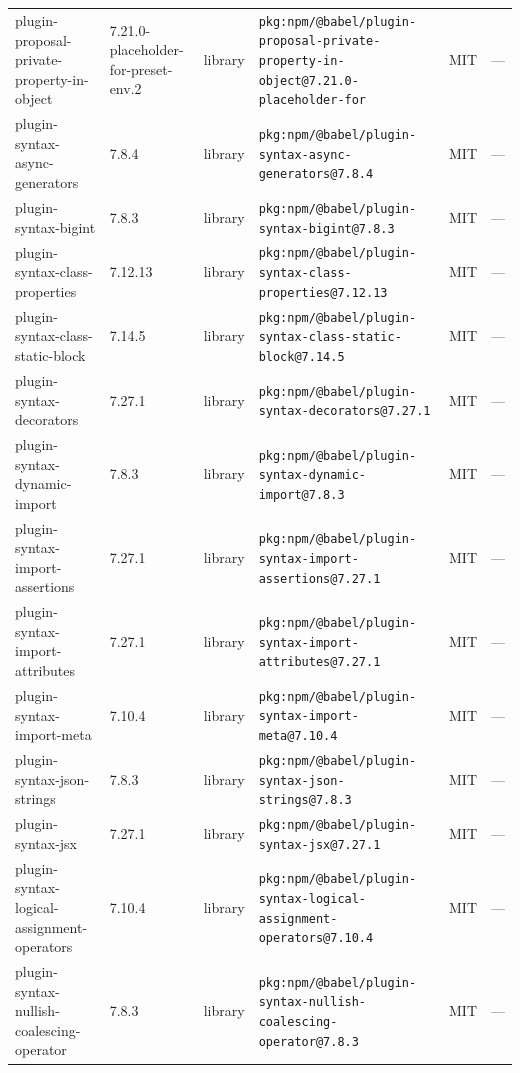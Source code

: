 \documentclass[11pt,a4paper]{article}
\begin{document}
\begin{longtable}{|p{4cm}|p{2cm}|p{1.6cm}|p{5cm}|p{1.5cm}|p{3.5cm}|}
\raggedright plugin-proposal-private-property-in-object & 7.21.0-placeholder-for-preset-env.2 & library & \small\texttt{pkg:npm/@babel/plugin-proposal-private-property-in-object@7.21.0-placeholder-for} & MIT & \small — \\
\raggedright plugin-syntax-async-generators & 7.8.4 & library & \small\texttt{pkg:npm/@babel/plugin-syntax-async-generators@7.8.4} & MIT & \small — \\
\raggedright plugin-syntax-bigint & 7.8.3 & library & \small\texttt{pkg:npm/@babel/plugin-syntax-bigint@7.8.3} & MIT & \small — \\
\raggedright plugin-syntax-class-properties & 7.12.13 & library & \small\texttt{pkg:npm/@babel/plugin-syntax-class-properties@7.12.13} & MIT & \small — \\
\raggedright plugin-syntax-class-static-block & 7.14.5 & library & \small\texttt{pkg:npm/@babel/plugin-syntax-class-static-block@7.14.5} & MIT & \small — \\
\raggedright plugin-syntax-decorators & 7.27.1 & library & \small\texttt{pkg:npm/@babel/plugin-syntax-decorators@7.27.1} & MIT & \small — \\
\raggedright plugin-syntax-dynamic-import & 7.8.3 & library & \small\texttt{pkg:npm/@babel/plugin-syntax-dynamic-import@7.8.3} & MIT & \small — \\
\raggedright plugin-syntax-import-assertions & 7.27.1 & library & \small\texttt{pkg:npm/@babel/plugin-syntax-import-assertions@7.27.1} & MIT & \small — \\
\raggedright plugin-syntax-import-attributes & 7.27.1 & library & \small\texttt{pkg:npm/@babel/plugin-syntax-import-attributes@7.27.1} & MIT & \small — \\
\raggedright plugin-syntax-import-meta & 7.10.4 & library & \small\texttt{pkg:npm/@babel/plugin-syntax-import-meta@7.10.4} & MIT & \small — \\
\raggedright plugin-syntax-json-strings & 7.8.3 & library & \small\texttt{pkg:npm/@babel/plugin-syntax-json-strings@7.8.3} & MIT & \small — \\
\raggedright plugin-syntax-jsx & 7.27.1 & library & \small\texttt{pkg:npm/@babel/plugin-syntax-jsx@7.27.1} & MIT & \small — \\
\raggedright plugin-syntax-logical-assignment-operators & 7.10.4 & library & \small\texttt{pkg:npm/@babel/plugin-syntax-logical-assignment-operators@7.10.4} & MIT & \small — \\
\raggedright plugin-syntax-nullish-coalescing-operator & 7.8.3 & library & \small\texttt{pkg:npm/@babel/plugin-syntax-nullish-coalescing-operator@7.8.3} & MIT & \small — \\

\end{longtable}
\end{document}
